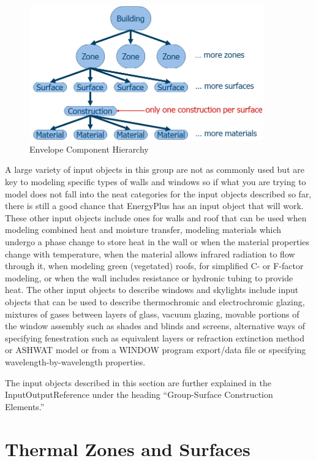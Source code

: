 \begin{figure}[hbtp]
\centering
\includegraphics[width=0.9\textwidth, height=0.9\textheight, keepaspectratio=true]{media/EnvelopeHierarchy.png}
\caption{Envelope Component Hierarchy}
\end{figure}

A large variety of input objects in this group are not as commonly
used but are key to modeling specific types of walls and windows so
if what you are trying to model does not fall into the neat categories
for the input objects described so far, there is still a good chance
that EnergyPlus has an input object that will work. These other input
objects include ones for walls and roof that can be used when modeling
combined heat and moisture transfer, modeling materials which undergo
a phase change to store heat in the wall or when the material properties
change with temperature, when the material allows infrared radiation
to flow through it, when modeling green (vegetated) roofs, for simplified
C- or F-factor modeling, or when the wall includes resistance or hydronic
tubing to provide heat. The other input objects to describe windows
and skylights include input objects that can be used to describe thermochromic
and electrochromic glazing, mixtures of gases between layers of glass,
vacuum glazing, movable portions of the window assembly such as shades
and blinds and screens, alternative ways of specifying fenestration
such as equivalent layers or refraction extinction method or ASHWAT
model or from a WINDOW program export/data file or specifying wavelength-by-wavelength
properties.

The input objects described in this section are further explained
in the InputOutputReference under the heading ``Group-Surface Construction
Elements.''

\section{Thermal Zones and Surfaces}

